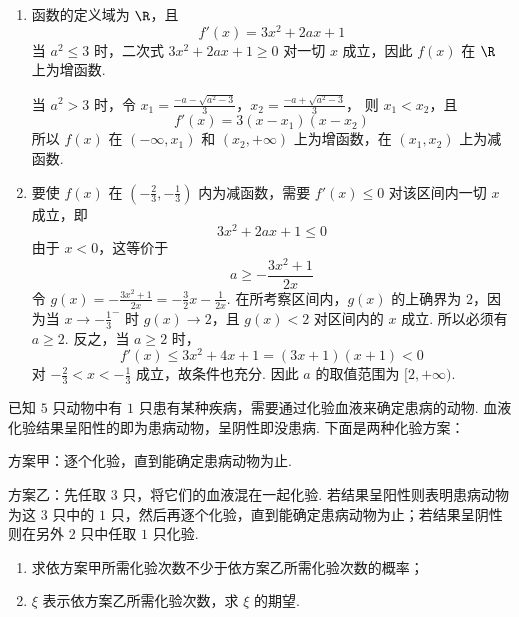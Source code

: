 \begin{solution}
\begin{enumerate}
\item 函数的定义域为 \(\R\)，且
\[
f'(x)=3x^2+2ax+1
\]
当 \(a^2\leqslant 3\) 时，二次式 \(3x^2+2ax+1\geqslant 0\) 对一切 \(x\) 成立，因此 \(f(x)\) 在 \(\R\) 上为增函数.

当 \(a^2>3\) 时，令
\(x_1=\frac{-a-\sqrt{a^2-3}}{3}\)，\(x_2=\frac{-a+\sqrt{a^2-3}}{3}\)，
则 \(x_1<x_2\)，且
\[
f'(x)=3(x-x_1)(x-x_2)
\]
所以 \(f(x)\) 在 \((-\infty,x_1)\) 和 \((x_2,+\infty)\) 上为增函数，在 \((x_1,x_2)\) 上为减函数.
\item 要使 \(f(x)\) 在 \(\left(-\frac{2}{3},-\frac{1}{3}\right)\) 内为减函数，需要 \(f'(x)\leqslant 0\) 对该区间内一切 \(x\) 成立，即
\[
3x^2+2ax+1\leqslant 0
\]
由于 \(x<0\)，这等价于
\[
a\geqslant-\frac{3x^2+1}{2x}
\]
令 \(g(x)=-\frac{3x^2+1}{2x}=-\frac{3}{2}x-\frac{1}{2x}\). 在所考察区间内，\(g(x)\) 的上确界为 \(2\)，因为当 \(x\to-\frac{1}{3}^{-}\) 时 \(g(x)\to 2\)，且 \(g(x)<2\) 对区间内的 \(x\) 成立. 所以必须有 \(a\geqslant2\). 反之，当 \(a\geqslant2\) 时，
\[
f'(x)\leqslant 3x^2+4x+1=(3x+1)(x+1)<0
\]
对 \(-\frac{2}{3}<x<-\frac{1}{3}\) 成立，故条件也充分. 因此 \(a\) 的取值范围为 \([2,+\infty)\).
\end{enumerate}
\end{solution}

\begin{problem}
已知 \(5\) 只动物中有 \(1\) 只患有某种疾病，需要通过化验血液来确定患病的动物. 血液化验结果呈阳性的即为患病动物，呈阴性即没患病. 下面是两种化验方案：

方案甲：逐个化验，直到能确定患病动物为止.

方案乙：先任取 \(3\) 只，将它们的血液混在一起化验. 若结果呈阳性则表明患病动物为这 \(3\) 只中的 \(1\) 只，然后再逐个化验，直到能确定患病动物为止；若结果呈阴性则在另外 \(2\) 只中任取 \(1\) 只化验.

\begin{enumerate}
\item 求依方案甲所需化验次数不少于依方案乙所需化验次数的概率；
\item \(\xi\) 表示依方案乙所需化验次数，求 \(\xi\) 的期望.
\end{enumerate}
\end{problem}

